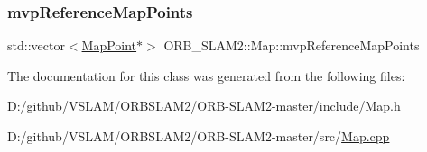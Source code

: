 \mbox{\label{class_o_r_b___s_l_a_m2_1_1_map_ad1d98a7e8207b995494afa7c098a7aaf}} 
\subsubsection{\texorpdfstring{mvp\+Reference\+Map\+Points}{mvpReferenceMapPoints}}
{\footnotesize\ttfamily std\+::vector$<$\mbox{\hyperlink{class_o_r_b___s_l_a_m2_1_1_map_point}{Map\+Point}}$\ast$$>$ O\+R\+B\+\_\+\+S\+L\+A\+M2\+::\+Map\+::mvp\+Reference\+Map\+Points\hspace{0.3cm}{\ttfamily [protected]}}



The documentation for this class was generated from the following files\+:\begin{DoxyCompactItemize}
\item 
D\+:/github/\+V\+S\+L\+A\+M/\+O\+R\+B\+S\+L\+A\+M2/\+O\+R\+B-\/\+S\+L\+A\+M2-\/master/include/\mbox{\hyperlink{_map_8h}{Map.\+h}}\item 
D\+:/github/\+V\+S\+L\+A\+M/\+O\+R\+B\+S\+L\+A\+M2/\+O\+R\+B-\/\+S\+L\+A\+M2-\/master/src/\mbox{\hyperlink{_map_8cpp}{Map.\+cpp}}\end{DoxyCompactItemize}
